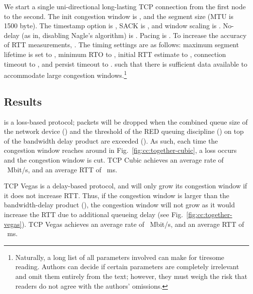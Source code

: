  We start a single uni-directional long-lasting TCP connection from the first node to the second. The init congestion window is , and the segment size  (MTU is 1500 byte). The timestamp option is , SACK is , and window scaling is . No-delay (as in, disabling Nagle's algorithm) is . Pacing is . To increase the accuracy of RTT measurements, . The timing settings are as follows: maximum segment lifetime is set to , minimum RTO to , initial RTT estimate to , connection timeout to , and persist timeout to .  such that there is sufficient data available to accommodate large congestion windows.\footnote{Naturally, a long list of all parameters involved can make for tiresome reading. Authors can decide if certain parameters are completely irrelevant and omit them entirely from the text; however, they must weigh the risk that readers do not agree with the authors' omissions.}

\subsection{Results}

\noindent\textbf{} is a loss-based protocol; packets will be dropped when the combined queue size of the network device () and the threshold of the RED queuing discipline () on top of the bandwidth delay product are exceeded (). As such, each time the congestion window reaches around  in Fig.~\ref{fig:cc:together-cubic}, a loss occurs and the congestion window is cut. TCP Cubic achieves an average rate of ~Mbit/s, and an average RTT of ~ms.

 TCP Vegas is a delay-based protocol, and will only grow its congestion window if it does not increase RTT. Thus, if the congestion window is larger than the bandwidth-delay product (), the congestion window will not grow as it would increase the RTT due to additional queueing delay (see Fig.~\ref{fig:cc:together-vegas}). TCP Vegas achieves an average rate of ~Mbit/s, and an average RTT of ~ms.

